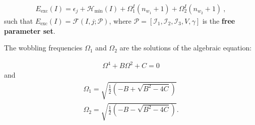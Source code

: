\documentclass[12pt, a4paper]{article}
\begin{document}
\begin{align}
    E_\text{exc}(I)=\epsilon_j+\mathcal{H}_\text{min}(I)+\Omega_1^I\left(n_{w_1}+1\right)+\Omega_2^I\left(n_{w_2}+1\right)\ ,
\end{align}
such that $E_\text{exc}(I)=\mathcal{F}(I,j;\mathcal{P})$, where $\mathcal{P}=\left[\mathcal{I}_1,\mathcal{I}_2,\mathcal{I}_3,V,\gamma\right]$ is the \textbf{free parameter set}.

The wobbling frequencies $\Omega_1$ and $\Omega_2$ are the solutions of the algebraic equation:

\begin{align}
    \Omega^4+B\Omega^2+C=0
\end{align}
and 
\begin{align}
    \Omega_1=\sqrt{\frac{1}{2}\left(-B+\sqrt{B^2-4C}\right)}\\
    \Omega_2=\sqrt{\frac{1}{2}\left(-B-\sqrt{B^2-4C}\right)}.
\end{align}

\newpage


\end{document}
